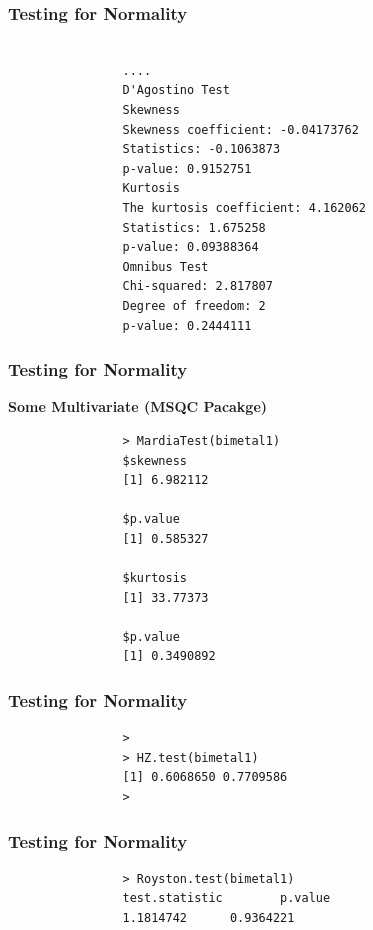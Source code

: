 \documentclass{beamer}
\begin{document}
		\begin{frame}[fragile]
			\frametitle{Testing for Normality}
			\begin{framed}
				\begin{verbatim}
				
				....
				D'Agostino Test
				Skewness
				Skewness coefficient: -0.04173762 
				Statistics: -0.1063873 
				p-value: 0.9152751 
				Kurtosis
				The kurtosis coefficient: 4.162062 
				Statistics: 1.675258 
				p-value: 0.09388364 
				Omnibus Test
				Chi-squared: 2.817807 
				Degree of freedom: 2
				p-value: 0.2444111 
				\end{verbatim}
			\end{framed}
		\end{frame}
		\begin{frame}[fragile]
			\frametitle{Testing for Normality}
			\textbf{Some Multivariate (MSQC Pacakge)}
			\begin{framed}
				\begin{verbatim}
				> MardiaTest(bimetal1)
				$skewness
				[1] 6.982112
				
				$p.value
				[1] 0.585327
				
				$kurtosis
				[1] 33.77373
				
				$p.value
				[1] 0.3490892
						\end{verbatim}
					\end{framed}
				\end{frame}
				\begin{frame}[fragile]
				\frametitle{Testing for Normality}
				\begin{framed}
					\begin{verbatim}
				>
				> HZ.test(bimetal1)
				[1] 0.6068650 0.7709586
				> 
						\end{verbatim}
					\end{framed}
				\end{frame}
				\begin{frame}[fragile]
				\frametitle{Testing for Normality}
					\begin{framed}
						\begin{verbatim}
				> Royston.test(bimetal1)
				test.statistic        p.value 
				1.1814742      0.9364221 
				\end{verbatim}
			\end{framed}
			
		\end{frame}
\end{document}
